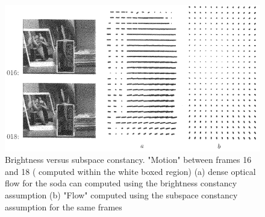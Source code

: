 \begin{Body}
								\begin{figure}[t]
								\center
								\includegraphics[width=1.0\textwidth]{thesis/TrackingPapers_SubspaceTracking_1998_Black_fig11_nocaption.png}
								\caption{Brightness versus subspace constancy.  "Motion" between frames 16 and 18 ( computed within the white boxed region) (a) dense optical flow for the soda can computed using the brightness constancy assumption (b) "Flow" computed using the subspace constancy assumption for the same frames \cite{1998_JNL_Eigentracking_Black}}
								\end{figure}



\end{Body}
